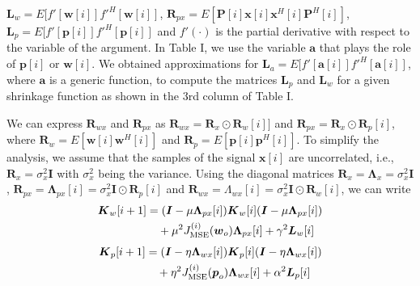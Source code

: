 \documentclass[10pt,onecolumn]{IEEEtran}
\begin{document}
${\boldsymbol L}_w = E[f'[{\boldsymbol w}[i]] f'^H[{\boldsymbol
w}[i]]$, ${\boldsymbol R}_{px} = E[{\boldsymbol P}[i]{\boldsymbol
x}[i] {\boldsymbol x}^H[i] {\boldsymbol P}^H[i]]$, ${\boldsymbol
L}_p = E[f'[{\boldsymbol p}[i]] f'^H[{\boldsymbol p}[i]]$ and
$f'(\cdot)$ is the partial derivative with respect to the variable
of the argument. In Table I, we use the variable ${\boldsymbol a}$
that plays the role of ${\boldsymbol p}[i]$ or ${\boldsymbol w}[i]$.
We obtained approximations for ${\boldsymbol L}_a =
E[f'[{\boldsymbol a}[i]] f'^H[{\boldsymbol a}[i]]$, where
${\boldsymbol a}$ is a generic function, to compute the matrices
${\boldsymbol L}_p$ and ${\boldsymbol L}_w$ for a given shrinkage
function as shown in the $3$rd column of Table I.

We can express ${\boldsymbol R}_{wx}$ and ${\boldsymbol R}_{px}$ as
${\boldsymbol R}_{wx} ={\boldsymbol R}_x \odot {\boldsymbol
R}_w[i]]$ and ${\boldsymbol R}_{px} ={\boldsymbol R}_x \odot
{\boldsymbol R}_p[i]$, where ${\boldsymbol R}_{w} = E[{\boldsymbol
w}[i]{\boldsymbol w}^H[i]]$ and ${\boldsymbol R}_{p} =
E[{\boldsymbol p}[i]{\boldsymbol p}^H[i]]$. To simplify the
analysis, we assume that the samples of the signal ${\boldsymbol
x}[i]$ are uncorrelated, i.e., ${\boldsymbol R}_x = \sigma_x^2
{\boldsymbol I}$ with $\sigma_x^2$ being the variance. Using the
diagonal matrices ${\boldsymbol R}_x = {\boldsymbol \Lambda}_x
=\sigma_x^2 {\boldsymbol I}$, ${\boldsymbol R}_{px} = {\boldsymbol
\Lambda}_{px}[i] = \sigma_x^2 {\boldsymbol I} \odot {\boldsymbol
R}_p[i]$ and ${\boldsymbol R}_{wx} = \Lambda_{wx}[i] = \sigma_x^2
{\boldsymbol I} \odot {\boldsymbol R}_w[i]$, we can write
\begin{equation}
\begin{split}
{\boldsymbol K}_{w} [i+1] & = ({\boldsymbol I} - \mu {\boldsymbol
\Lambda}_{px}[i]){\boldsymbol K}_{w} [i] ({\boldsymbol I} - \mu
{\boldsymbol \Lambda}_{px}[i]) \\ & \quad + \mu^2 J_{\rm
MSE}^{(i)}({\boldsymbol w}_{o}) {\boldsymbol \Lambda}_{px}[i] +
\gamma^2 {\boldsymbol L}_w[i]
\end{split}
\end{equation}
\begin{equation}
\begin{split}
{\boldsymbol K}_{p} [i+1] & = ({\boldsymbol I} - \eta {\boldsymbol
\Lambda}_{wx}[i]){\boldsymbol K}_{p} [i] ({\boldsymbol I} - \eta
{\boldsymbol \Lambda}_{wx}[i]) \\ & \quad + \eta^2 J_{\rm
MSE}^{(i)}({\boldsymbol p}_{o}) {\boldsymbol \Lambda}_{wx}[i] +
\alpha^2 {\boldsymbol L}_{p}[i]
\end{split}
\end{equation}
\end{document}
